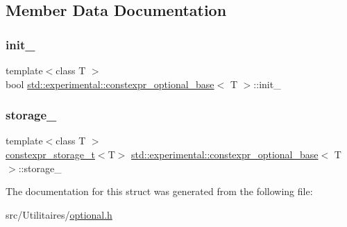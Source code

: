 \subsection{Member Data Documentation}
\mbox{\label{structstd_1_1experimental_1_1constexpr__optional__base_aef0ac13a059b733b785544ade26f3354}} 
\subsubsection{\texorpdfstring{init\+\_\+}{init\_}}
{\footnotesize\ttfamily template$<$class T $>$ \\
bool \mbox{\hyperlink{structstd_1_1experimental_1_1constexpr__optional__base}{std\+::experimental\+::constexpr\+\_\+optional\+\_\+base}}$<$ T $>$\+::init\+\_\+}

\mbox{\label{structstd_1_1experimental_1_1constexpr__optional__base_a21e4f97ec2334b123f8e7c7a9d50c9b1}} 
\subsubsection{\texorpdfstring{storage\+\_\+}{storage\_}}
{\footnotesize\ttfamily template$<$class T $>$ \\
\mbox{\hyperlink{unionstd_1_1experimental_1_1constexpr__storage__t}{constexpr\+\_\+storage\+\_\+t}}$<$T$>$ \mbox{\hyperlink{structstd_1_1experimental_1_1constexpr__optional__base}{std\+::experimental\+::constexpr\+\_\+optional\+\_\+base}}$<$ T $>$\+::storage\+\_\+}



The documentation for this struct was generated from the following file\+:\begin{DoxyCompactItemize}
\item 
src/\+Utilitaires/\mbox{\hyperlink{optional_8h}{optional.\+h}}\end{DoxyCompactItemize}

